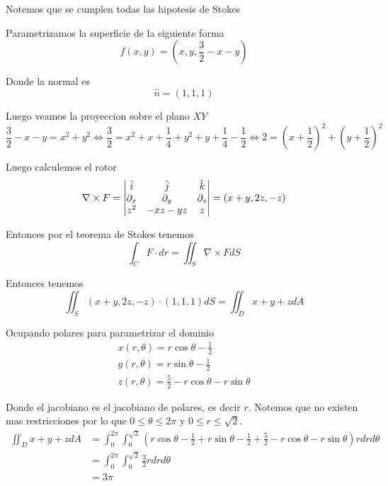 \message{ !name(MAT024.tex)}\documentclass[../main.tex]{subfiles}
\begin{document}
\begin{solution}
  Notemos que se cumplen todas las hipotesis de Stokes

  Parametrizamos la superficie de la siguiente forma
  \begin{equation*}
    f(x, y) = (x, y, \frac32 - x - y)
  \end{equation*}

  Donde la normal es
  \begin{equation*}
    \hat{n} = (1, 1, 1)
  \end{equation*}

  Luego veamos la proyeccion sobre el plano $XY$
  \begin{equation*}
    \frac32 - x - y = x^{2} + y^{2} \iff \frac32 = x^{2} + x + \frac14 + y^{2} + y + \frac14 - \frac12 \iff 2 = (x + \frac12)^{2} + (y + \frac12)^{2}
  \end{equation*}

  Luego calculemos el rotor
  \begin{equation*}
    \nabla \times F = \begin{vmatrix} \hat{i} & \hat{j} & \hat{k}\\ \partial_x & \partial_y & \partial_z\\ z^{2} & -xz - yz & z\end{vmatrix} = (x + y, 2z, -z)
  \end{equation*}


  Entonces por el teorema de Stokes tenemos
  \begin{equation*}
    \int_{C} F \cdot dr = \iint_{S} \nabla \times F dS
  \end{equation*}

  Entonces tenemos
  \begin{equation*}
    \iint_{S} (x + y, 2z, -z) \cdot (1, 1, 1) dS = \iint_{D} x + y + z dA
  \end{equation*}

  Ocupando polares para parametrizar el dominio
  \begin{gather*}
    x(r, \theta) = r \cos \theta - \frac12\\
    y(r, \theta) = r \sin \theta - \frac12\\
    z(r, \theta) = \frac52 - r \cos \theta - r \sin \theta
  \end{gather*}

  Donde el jacobiano es el jacobiano de polares, es decir $r$. Notemos que no existen mas restricciones por lo que $0 \leq \theta \leq 2\pi$ y $0 \leq r \leq \sqrt{2}$.
  \begin{align}
    \iint_{D} x + y + z dA &= \int_{0}^{2\pi}\int_{0}^{\sqrt2} (r \cos \theta - \frac12 + r \sin \theta - \frac12 + \frac52 - r \cos \theta - r \sin \theta)r dr d \theta\\
                           &= \int_{0}^{2\pi}\int_{0}^{\sqrt2} \frac32 r dr d \theta\\
                           &= 3\pi
  \end{align}
\end{solution}
\end{document}
